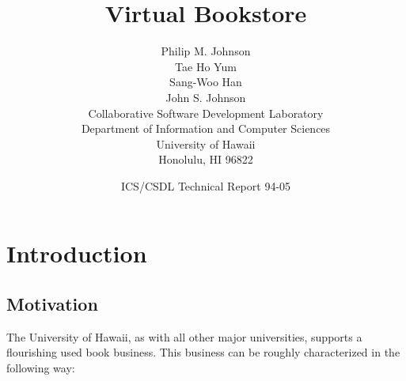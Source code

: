 



\title{Virtual Bookstore}
\author{Philip M. Johnson\\
	Tae Ho Yum\\
	Sang-Woo Han\\
	John S. Johnson\\
  Collaborative Software Development Laboratory\\
  Department of Information and Computer Sciences\\
  University of Hawaii\\
  Honolulu, HI 96822\\}	

\date{ICS/CSDL Technical Report 94-05}


\maketitle 

\newpage
\tableofcontents
\newpage


\chapter{Introduction}

\section{Motivation}

The University of Hawaii, as with all other major universities, supports a
flourishing used book business.  This business can be roughly characterized
in the following way:

